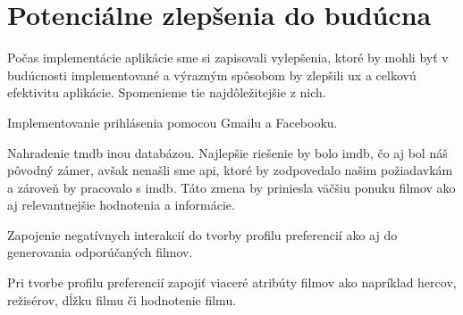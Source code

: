 \section{Potenciálne zlepšenia do budúcna}
Počas implementácie aplikácie sme si zapisovali vylepšenia, ktoré by mohli byť v budúcnosti implementované a výrazným spôsobom by zlepšili \acrshort{ux} a celkovú efektivitu aplikácie. Spomenieme tie najdôležitejšie z nich.
\begin{itemize}
{\item Implementovanie prihlásenia pomocou Gmailu a Facebooku.}
{\item Nahradenie \acrshort{tmdb} inou databázou. Najlepšie riešenie by bolo \acrshort{imdb}, čo aj bol náš pôvodný zámer, avšak nenašli sme \acrshort{api}, ktoré by zodpovedalo našim požiadavkám a zároveň by pracovalo s \acrshort{imdb}. Táto zmena by priniesla väčšiu ponuku filmov ako aj relevantnejšie hodnotenia a informácie.}
{\item Zapojenie negatívnych interakcií do tvorby profilu preferencií ako aj do generovania odporúčaných filmov.}
{\item Pri tvorbe profilu preferencií zapojiť viaceré atribúty filmov ako napríklad hercov, režisérov, dĺžku filmu či hodnotenie filmu.}
\end{itemize}









